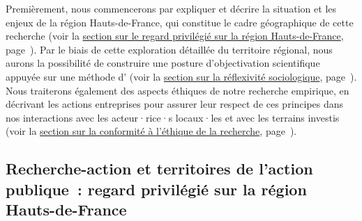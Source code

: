 \begin{refsegment}
Premièrement, nous commencerons par expliquer et décrire la situation et les enjeux de la région Hauts-de-France, qui constitue le cadre géographique de cette recherche (voir la \hyperref[chap3:regard-privilegie-region-hdf]{section sur le regard privilégié sur la région Hauts-de-France}, page~\pageref{chap3:regard-privilegie-region-hdf}). Par le biais de cette exploration détaillée du territoire régional, nous aurons la possibilité de construire une posture d'objectivation scientifique appuyée sur une méthode d' (voir la \hyperref[chap3:auto-analyse-sociologique]{section sur la réflexivité sociologique}, page~\pageref{chap3:auto-analyse-sociologique}). Nous traiterons également des aspects éthiques de notre recherche empirique, en décrivant les actions entreprises pour assurer leur respect de ces principes dans nos interactions avec les acteur·rice·s locaux·les et avec les terrains investis (voir la \hyperref[chap3:preparation-terrain-geographique]{section sur la conformité à l’éthique de la recherche}, page~\pageref{chap3:preparation-terrain-geographique}).%

\subsection{Recherche-action et territoires de l'action publique~: regard privilégié sur la région Hauts-de-France
    \label{chap3:regard-privilegie-region-hdf}
    }


\end{refsegment}
